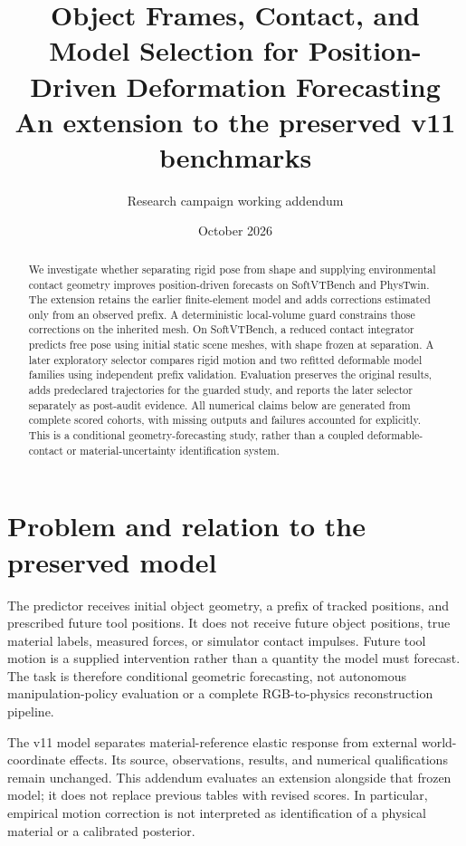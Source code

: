 \documentclass[10pt]{article}
\title{Object Frames, Contact, and Model Selection for Position-Driven Deformation Forecasting\\\large An extension to the preserved v11 benchmarks}
\author{Research campaign working addendum}
\date{October 2026}
\begin{document}
\maketitle

\begin{abstract}
We investigate whether separating rigid pose from shape and supplying environmental contact geometry improves position-driven forecasts on SoftVTBench and PhysTwin. The extension retains the earlier finite-element model and adds corrections estimated only from an observed prefix. A deterministic local-volume guard constrains those corrections on the inherited mesh. On SoftVTBench, a reduced contact integrator predicts free pose using initial static scene meshes, with shape frozen at separation. A later exploratory selector compares rigid motion and two refitted deformable model families using independent prefix validation. Evaluation preserves the original results, adds predeclared trajectories for the guarded study, and reports the later selector separately as post-audit evidence. All numerical claims below are generated from complete scored cohorts, with missing outputs and failures accounted for explicitly. This is a conditional geometry-forecasting study, rather than a coupled deformable-contact or material-uncertainty identification system.
\end{abstract}

\section{Problem and relation to the preserved model}
The predictor receives initial object geometry, a prefix of tracked positions, and prescribed future tool positions. It does not receive future object positions, true material labels, measured forces, or simulator contact impulses. Future tool motion is a supplied intervention rather than a quantity the model must forecast. The task is therefore conditional geometric forecasting, not autonomous manipulation-policy evaluation or a complete RGB-to-physics reconstruction pipeline.

The v11 model separates material-reference elastic response from external world-coordinate effects. Its source, observations, results, and numerical qualifications remain unchanged. This addendum evaluates an extension alongside that frozen model; it does not replace previous tables with revised scores. In particular, empirical motion correction is not interpreted as identification of a physical material or a calibrated posterior.
\end{document}
